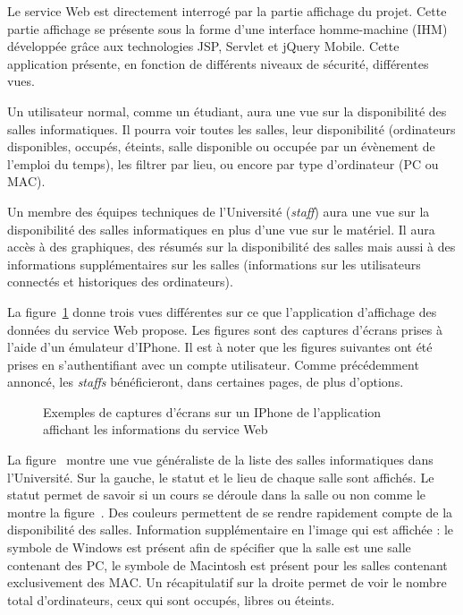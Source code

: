 Le service Web est directement interrog\'e par la partie affichage du projet.
Cette partie affichage se pr\'esente sous la forme d'une interface homme-machine (IHM) d\'evelopp\'ee gr\^ace aux technologies JSP, Servlet et jQuery Mobile.
Cette application pr\'esente, en fonction de diff\'erents niveaux de s\'ecurit\'e, diff\'erentes vues.

Un utilisateur normal, comme un \'etudiant, aura une vue sur la disponibilit\'e des salles informatiques.
Il pourra voir toutes les salles, leur disponibilit\'e (ordinateurs disponibles, occup\'es, \'eteints, salle disponible ou occup\'ee par un \'ev\`enement de l'emploi du temps), les filtrer par lieu, ou encore par type d'ordinateur (PC ou MAC).

Un membre des \'equipes techniques de l'Universit\'e (\textit{staff}) aura une vue sur la disponibilit\'e des salles informatiques en plus d'une vue sur le mat\'eriel.
Il aura acc\`es \`a des graphiques, des r\'esum\'es sur la disponibilit\'e des salles mais aussi \`a des informations suppl\'ementaires sur les salles (informations sur les utilisateurs connect\'es et historiques des ordinateurs).

La figure~\ref{figure:exempleIPhone} donne trois vues diff\'erentes sur ce que l'application d'affichage des donn\'ees du service Web propose.
Les figures sont des captures d'\'ecrans prises \`a l'aide d'un \'emulateur d'IPhone.
Il est \`a noter que les figures suivantes ont \'et\'e prises en s'authentifiant avec un compte utilisateur.
Comme pr\'ec\'edemment annonc\'e, les \textit{staffs} b\'en\'eficieront, dans certaines pages, de plus d'options.

\begin{figure}[!ht]
	\centering
	\qquad
	\qquad
	\caption{Exemples de captures d'\'ecrans sur un IPhone de l'application affichant les informations du service Web}
	\label{figure:exempleIPhone}

\end{figure}

La figure~ montre une vue g\'en\'eraliste de la liste des salles informatiques dans l'Universit\'e.
Sur la gauche, le statut et le lieu de chaque salle sont affich\'es. 
Le statut permet de savoir si un cours se d\'eroule dans la salle ou non comme le montre la figure~.
Des couleurs permettent de se rendre rapidement compte de la disponibilit\'e des salles.
Information suppl\'ementaire en l'image qui est affich\'ee : le symbole de Windows est pr\'esent afin de sp\'ecifier que la salle est une salle contenant des PC, le symbole de Macintosh est pr\'esent pour les salles contenant exclusivement des MAC.
Un r\'ecapitulatif sur la droite permet de voir le nombre total d'ordinateurs, ceux qui sont occup\'es, libres ou \'eteints.


